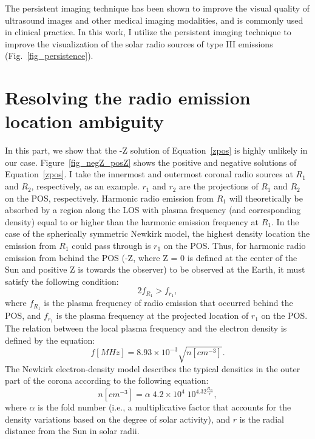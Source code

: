 The persistent imaging technique has been shown to improve the visual quality of ultrasound images and other medical imaging modalities, and is commonly used in clinical practice. In this work, I utilize the persistent imaging technique to improve the visualization of the solar radio sources of type III emissions (Fig.~\ref{fig_persistence}).

\section{Resolving the radio emission location ambiguity}
\label{ch3_append_b}
In this part, we show that the -Z solution of Equation~\ref{zpos} is highly unlikely in our case. Figure~\ref{fig_negZ_posZ} shows the positive and negative solutions of Equation~\ref{zpos}. I take the innermost and outermost coronal radio sources at $R_1$ and $R_2$, respectively, as an example. $r_1$ and $r_2$ are the projections of $R_1$ and $R_2$ on the POS, respectively. Harmonic radio emission from $R_1$ will theoretically be absorbed by a region along the LOS with plasma frequency (and corresponding density) equal to or higher than the harmonic emission frequency at $R_1$. In the case of the spherically symmetric Newkirk model, the highest density location the emission from $R_1$ could pass through is $r_1$ on the POS. Thus, for harmonic radio emission from behind the POS (-Z, where Z = 0 is defined at the center of the Sun and positive Z is towards the observer) to be observed at the Earth, it must satisfy the following condition:
\begin{equation}
	2f_{R_1} > f_{r_1}
	\label{eq_assumption}
	,\end{equation}
where $f_{R_1}$ is the plasma frequency of radio emission that occurred behind the POS, and $f_{r_1}$ is the plasma frequency at the projected location of $r_1$ on the POS.
The relation between the local plasma frequency and the electron density is defined by the equation:
\begin{equation}
	f[MHz] = 8.93 \times 10^{-3} \sqrt{n[cm^{-3}]}
	\label{eq_plasmafreq}
	.\end{equation}
The Newkirk electron-density model \citep{newkirk_1961, newkirk_1967} describes the typical densities in the outer part of the corona according to the following equation:
\begin{equation}
	n[cm^{-3}] = \alpha \; 4.2 \times 10^4 \; 10^{4.32 \frac{R_\odot}{r}}
	\label{eq_newkirk}
	,\end{equation}
where $\alpha$ is the fold number (i.e., a multiplicative factor that accounts for the density variations based on the degree of solar activity), and $r$ is the radial distance from the Sun in solar radii.
